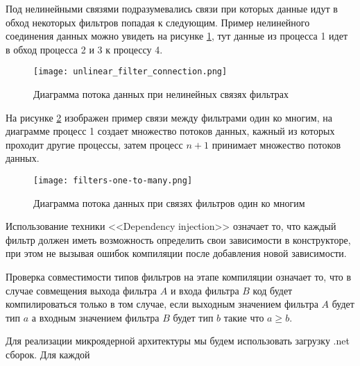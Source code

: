 Под нелинейными связями подразумевались связи при которых данные идут в обход некоторых фильтров попадая к следующим. Пример нелинейного соединения данных можно увидеть на рисунке \ref{fig:creation:unlinear_filter_connection}, тут данные из процесса 1 идет в обход процесса 2 и 3 к процессу 4.
\begin{figure}[ht] 
    \centering
    \texttt{[image: unlinear\_filter\_connection.png]}  
    \caption{Диаграмма потока данных при нелинейных связях фильтрах}
    \label{fig:creation:unlinear_filter_connection}
\end{figure}

На рисунке \ref{fig:creation:filters-one-to-many} изображен пример связи между фильтрами один ко многим, на диаграмме процесс 1 создает множество потоков данных, кажный из которых проходит другие процессы, затем процесс $n+1$ принимает множество потоков данных.
\begin{figure}[ht] 
    \centering
    \texttt{[image: filters-one-to-many.png]}  
    \caption{Диаграмма потока данных при связях фильтров один ко многим}
    \label{fig:creation:filters-one-to-many}
\end{figure}

Использование техники <<Dependency injection>> означает то, что каждый фильтр должен иметь возможность определить свои зависимости в конструкторе, при этом не вызывая ошибок компиляции после добавления новой зависимости.

Проверка совместимости типов фильтров на этапе компиляции означает то, что в случае совмещения выхода фильтра $A$ и входа фильтра $B$ код будет компилироваться только в том случае, если выходным значением фильтра $A$ будет тип $a$ а входным значением фильтра $B$ будет тип $b$ такие что $a \geq b$.

Для реализации микроядерной архитектуры мы будем использовать загрузку .net сборок. Для каждой 